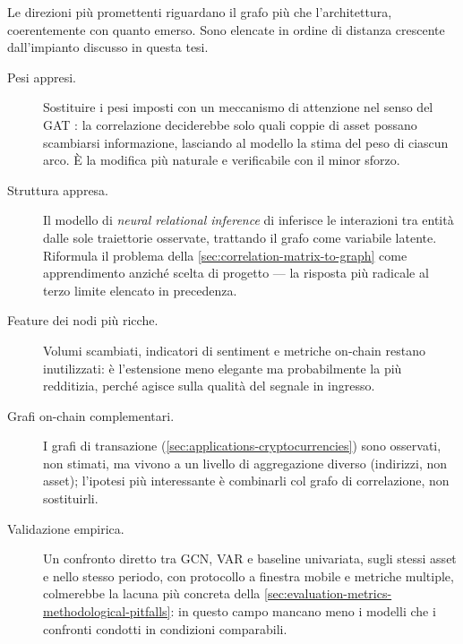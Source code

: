 Le direzioni più promettenti riguardano il grafo più che l'architettura, coerentemente con quanto emerso. Sono elencate in ordine di distanza crescente dall'impianto discusso in questa tesi.

\begin{description}
    \item[Pesi appresi.] Sostituire i pesi imposti con un meccanismo di attenzione nel senso del GAT \cite{velickovic2018gat}: la correlazione deciderebbe solo quali coppie di asset possano scambiarsi informazione, lasciando al modello la stima del peso di ciascun arco. È la modifica più naturale e verificabile con il minor sforzo.
    \item[Struttura appresa.] Il modello di \emph{neural relational inference} di \textcite{kipf2018nri} inferisce le interazioni tra entità dalle sole traiettorie osservate, trattando il grafo come variabile latente. Riformula il problema della \cref{sec:correlation-matrix-to-graph} come apprendimento anziché scelta di progetto — la risposta più radicale al terzo limite elencato in precedenza.
    \item[Feature dei nodi più ricche.] Volumi scambiati, indicatori di sentiment e metriche on-chain restano inutilizzati: è l'estensione meno elegante ma probabilmente la più redditizia, perché agisce sulla qualità del segnale in ingresso.
    \item[Grafi on-chain complementari.] I grafi di transazione (\cref{sec:applications-cryptocurrencies}) sono osservati, non stimati, ma vivono a un livello di aggregazione diverso (indirizzi, non asset); l'ipotesi più interessante è combinarli col grafo di correlazione, non sostituirli.
    \item[Validazione empirica.] Un confronto diretto tra GCN, VAR e baseline univariata, sugli stessi asset e nello stesso periodo, con protocollo a finestra mobile e metriche multiple, colmerebbe la lacuna più concreta della \cref{sec:evaluation-metrics-methodological-pitfalls}: in questo campo mancano meno i modelli che i confronti condotti in condizioni comparabili.
\end{description}

